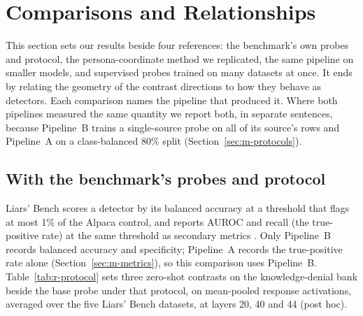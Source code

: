 
\section{Comparisons and Relationships}
\label{sec:r-compare}

This section sets our results beside four references: the benchmark's own probes and protocol, the persona-coordinate method we replicated, the same pipeline on smaller models, and supervised probes trained on many datasets at once.
It ends by relating the geometry of the contrast directions to how they behave as detectors.
Each comparison names the pipeline that produced it.
Where both pipelines measured the same quantity we report both, in separate sentences, because Pipeline~B trains a single-source probe on all of its source's rows and Pipeline~A on a class-balanced 80\% split (Section~\ref{sec:m-protocols}). %

\subsection{With the benchmark's probes and protocol}
\label{sec:r-cmp-lb}

Liars' Bench scores a detector by its balanced accuracy at a threshold that flags at most 1\% of the Alpaca control, and reports AUROC and recall (the true-positive rate) at the same threshold as secondary metrics \parencite[p.~7]{kretschmar2025liars}.
Only Pipeline~B records balanced accuracy and specificity; Pipeline~A records the true-positive rate alone (Section~\ref{sec:m-metrics}), so this comparison uses Pipeline~B. %
Table~\ref{tab:r-protocol} sets three zero-shot contrasts on the knowledge-denial bank beside the base probe under that protocol, on mean-pooled response activations, averaged over the five Liars' Bench datasets, at layers 20, 40 and 44 (post hoc). %


